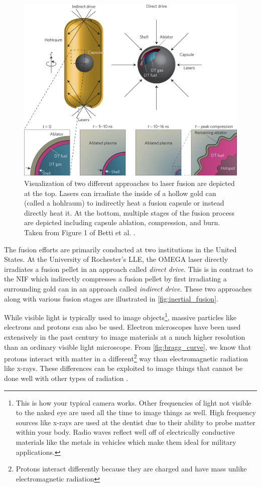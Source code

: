 \begin{figure}
	\centering
	\includegraphics[width=0.9\linewidth]{planning/images/fusion.png}
	\caption{Visualization of two different approaches to laser fusion are depicted at the top. Lasers can irradiate the inside of a hollow gold can (called a hohlraum) to indirectly heat a fusion capsule or instead directly heat it. At the bottom, multiple stages of the fusion process are depicted including capsule ablation, compression, and burn. Taken from Figure 1 of Betti et al. \cite{Betti_2016_Nature}. }
	\label{fig:inertial_fusion}
\end{figure}

The fusion efforts are primarily conducted at two institutions in the United States. At the University of Rochester's \gls{LLE}, the OMEGA laser directly irradiates a fusion pellet in an approach called \emph{direct drive}. This is in contrast to the \gls{NIF} which indirectly compresses a fusion pellet by first irradiating a surrounding gold can in an approach called \emph{indirect drive}. These two approaches along with various fusion stages are illustrated in \autoref{fig:inertial_fusion}.

While visible light is typically used to image objects\footnote{This is how your typical camera works. Other frequencies of light not visible to the naked eye are used all the time to image things as well. High frequency sources like x-rays are used at the dentist due to their ability to probe matter within your body. Radio waves reflect well off of electrically conductive materials like the metals in vehicles which make them ideal for military applications.}, massive particles like electrons and protons can also be used. Electron microscopes have been used extensively in the past century to image materials at a much higher resolution than an ordinary visible light microscope. From \autoref{fig:bragg_curve}, we know that protons interact with matter in a different\footnote{Protons interact differently because they are charged and have mass unlike electromagnetic radiation} way than electromagnetic radiation like x-rays. These differences can be exploited to image things that cannot be done well with other types of radiation \cite{Schaeffer_2023_RevMod}.


